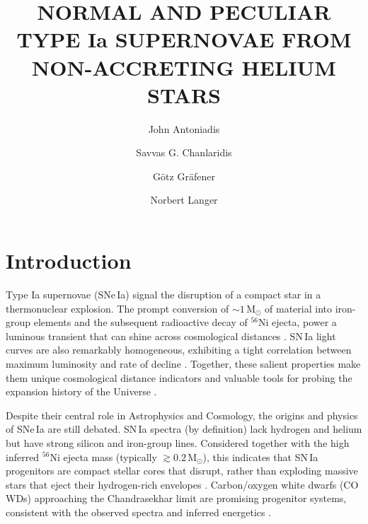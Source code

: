\documentclass[twocolumn,tighten,times]{aastex62}
\begin{document}
\title{NORMAL AND PECULIAR TYPE Ia SUPERNOVAE FROM NON-ACCRETING HELIUM STARS}



\author[0000-0002-0786-7307]{John Antoniadis}


\author{Savvas G. Chanlaridis}
\author{G\"{o}tz Gr\"{a}fener}
\author{Norbert Langer}

\begin{abstract}
  
\end{abstract}



\section{Introduction} \label{sec:intro}
Type Ia supernovae (SNe\,Ia) signal the  disruption of a compact star 
in a thermonuclear explosion. The prompt conversion of $\sim 1$\,M$_{\odot}$ of  
material into iron-group elements and the subsequent radioactive decay of $^{56}$Ni
ejecta, power a luminous transient that can shine across 
cosmological distances \citep[e.g.][]{Arnett:1982}. SN\,Ia light curves are 
also remarkably homogeneous, exhibiting a tight correlation between maximum luminosity and 
rate of decline \citep{Phillips:1993ng}. Together, these  salient properties make them 
unique cosmological distance indicators and valuable tools for probing the expansion 
history of the Universe \citep{Riess:1998cb,Perlmutter:1998np}. 

 Despite their central role in Astrophysics and Cosmology, 
 the origins and physics of SNe\,Ia are still debated. 
 SN\,Ia spectra (by definition) lack hydrogen and helium but have strong silicon and iron-group lines. 
 Considered together with the high inferred  $^{56}$Ni ejecta mass (typically $\gtrsim 0.2$\,M$_{\odot}$), this indicates  that SN\,Ia progenitors are 
 compact stellar cores that disrupt, rather than exploding 
 massive stars that eject their hydrogen-rich envelopes
 \citep[][and references therein]{Maoz:2013hna}. 
 Carbon/oxygen white dwarfs (CO WDs) approaching the Chandrasekhar limit 
 are promising progenitor systems, consistent with the observed 
 spectra and inferred energetics \citep{Arnett:1969,Wang:2012za,Maoz:2013hna}.
 
\end{document}
